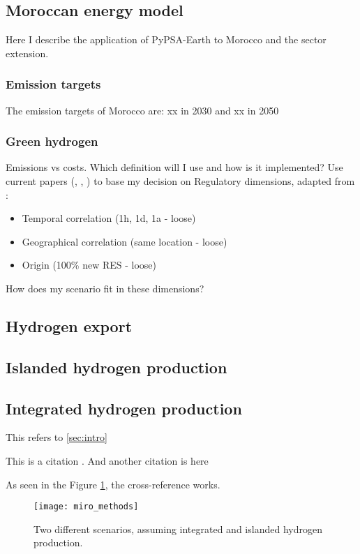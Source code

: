 
\subsection{Moroccan energy model}
Here I describe the application of PyPSA-Earth \cite{Parzen2022} to Morocco and the sector extension.
\subsubsection{Emission targets}
The emission targets of Morocco are: xx in 2030 and xx in 2050
\subsubsection{Green hydrogen}
Emissions vs costs. Which definition will I use and how is it implemented?
Use current papers (\cite{Brauer2022}, \cite{Ruhnau2022}, \cite{Zeyen2022}) to base my decision on
Regulatory dimensions, adapted from \cite{Brauer2022}:
\begin{itemize}
    \item Temporal correlation (1h, 1d, 1a - loose) 
    \item Geographical correlation (same location - loose)
    \item Origin (100\% new RES - loose)
\end{itemize}
How does my scenario fit in these dimensions?
\subsection{Hydrogen export}
\subsection{Islanded hydrogen production}
\subsection{Integrated hydrogen production}

This refers to \ref{sec:intro}

This is a citation \cite{Schumm2018}. And another citation is here \cite{Neumann2021}

As seen in the Figure \ref{fig:methods_scenarios}, the cross-reference works.

\begin{figure}[h!]
    \centering
    \texttt{[image: miro\_methods]}
    \caption{Two different scenarios, assuming integrated and islanded hydrogen production.}
    \label{fig:methods_scenarios}
\end{figure}


